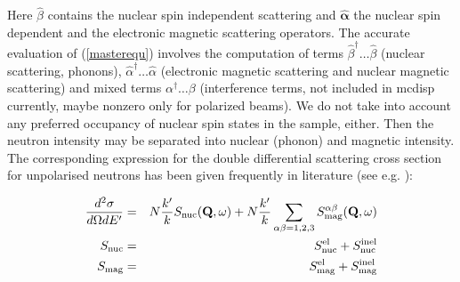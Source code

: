 Here $\hat \beta$ contains the nuclear spin independent scattering and $\hat {\bm \alpha}$ the nuclear spin dependent
and the electronic magnetic scattering operators.
The accurate evaluation of (\ref{masterequ}) involves the computation of terms $\hat \beta^{\dagger} \dots \hat \beta$ (nuclear scattering, phonons),
$\hat \alpha^{\dagger} \dots \hat \alpha$ (electronic magnetic scattering and nuclear magnetic scattering) 
and mixed terms $\alpha^{\dagger} \dots \beta$ (interference terms, not included in mcdisp currently, maybe nonzero only for
polarized beams).  We do not take into account any preferred occupancy of nuclear spin states in the sample, either.
Then the neutron intensity may be separated into nuclear (phonon) and magnetic intensity.
The corresponding expression for the double differential scattering cross section 
for unpolarised neutrons has been given frequently in literature (see e.g. \cite{lovesey84-1}):



\begin{eqnarray}\label{dsdoderepeated}
\frac{d^2\sigma}{d\Omega dE'}&=&
N\frac{k'}{k}S_{\rm nuc}(\mathbf Q,\omega) +
N\frac{k'}{k} \sum_{\alpha\beta=1,2,3} S^{\alpha \beta}_{\rm mag}(\mathbf Q,\omega) \nonumber \\
S_{\rm nuc}&=&S_{\rm nuc}^{\rm el}+S_{\rm nuc}^{\rm inel} \label{snuc} \\ 
S_{\rm mag}&=&S_{\rm mag}^{\rm el}+S_{\rm mag}^{\rm inel} \label{smag} 
\end{eqnarray}


